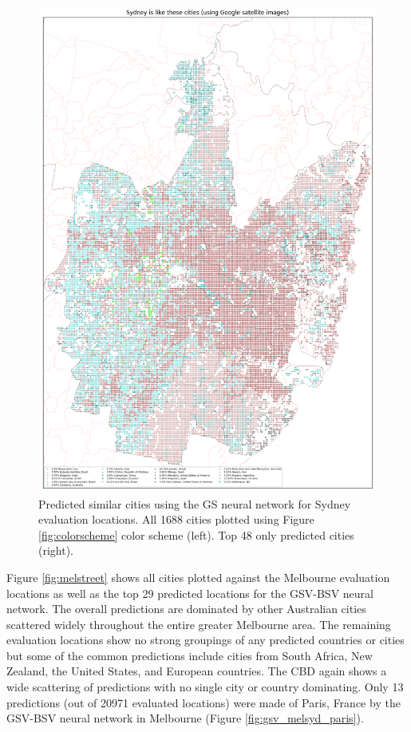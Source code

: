 \documentclass[sageh,times]{sagej}
\begin{document}
\begin{figure}[!htbp]
\includegraphics[scale=0.20]{Images/SydneyOverallAbrev_sat.png} 
\caption{Predicted similar cities using the GS neural network for Sydney evaluation locations. All 1688 cities plotted using Figure \ref{fig:colorscheme} color scheme (left). Top 48 only predicted cities (right).}    
 \label{fig:sydsat}  
\end{figure} 



Figure \ref{fig:melstreet} shows all cities plotted against the Melbourne evaluation locations as well as the top 29 predicted locations for the GSV-BSV neural network. The overall predictions are dominated by other Australian cities scattered widely throughout the entire greater Melbourne area. The remaining evaluation locations show no strong groupings of any predicted countries or cities but some of the common predictions include cities from South Africa, New Zealand, the United States, and European countries. The CBD again shows a wide scattering of predictions with no single city or country dominating. Only 13 predictions (out of 20971 evaluated locations) were made of Paris, France by the GSV-BSV neural network in Melbourne (Figure \ref{fig:gsv_melsyd_paris}).
\end{document}
